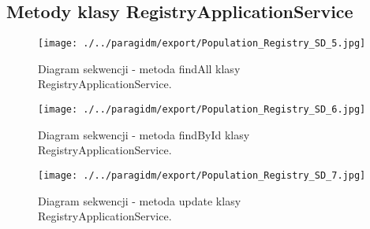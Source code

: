 \documentclass[12pt]{article}
\begin{document}
\subsection{Metody klasy RegistryApplicationService}
\begin{figure}[H]
    \centering
    \texttt{[image: ./../paragidm/export/Population\_Registry\_SD\_5.jpg]}
    \caption{Diagram sekwencji - metoda findAll klasy RegistryApplicationService.}
    \label{}
\end{figure}


\begin{figure}[H]
    \centering
    \texttt{[image: ./../paragidm/export/Population\_Registry\_SD\_6.jpg]}
    \caption{Diagram sekwencji - metoda findById klasy RegistryApplicationService.}
    \label{}
\end{figure}


\begin{figure}[H]
    \centering
    \texttt{[image: ./../paragidm/export/Population\_Registry\_SD\_7.jpg]}
    \caption{Diagram sekwencji - metoda update klasy RegistryApplicationService.}
    \label{}
\end{figure}

\end{document}
